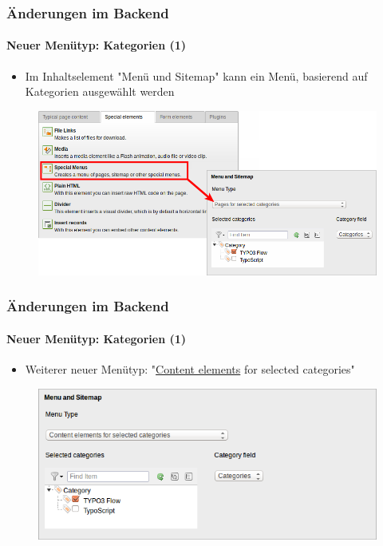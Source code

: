 
\begin{frame}[fragile]
	\frametitle{Änderungen im Backend}
	\framesubtitle{Neuer Menütyp: Kategorien (1)}

	\begin{itemize}
		\item Im Inhaltselement "Menü und Sitemap" kann ein Menü, basierend auf Kategorien ausgewählt werden
	\end{itemize}

	\begin{figure}
		\includegraphics[width=0.8\linewidth]{Images/BackendChanges/CategoryBasedMenus.png}
	\end{figure}

\end{frame}


\begin{frame}[fragile]
	\frametitle{Änderungen im Backend}
	\framesubtitle{Neuer Menütyp: Kategorien (1)}

	\begin{itemize}
		\item Weiterer neuer Menütyp: "\underline{Content elements} for selected categories"
	\end{itemize}

	\begin{figure}
		\includegraphics[width=0.6\linewidth]{Images/BackendChanges/ContentElementsForSelectedCategories.png}
	\end{figure}

\end{frame}

